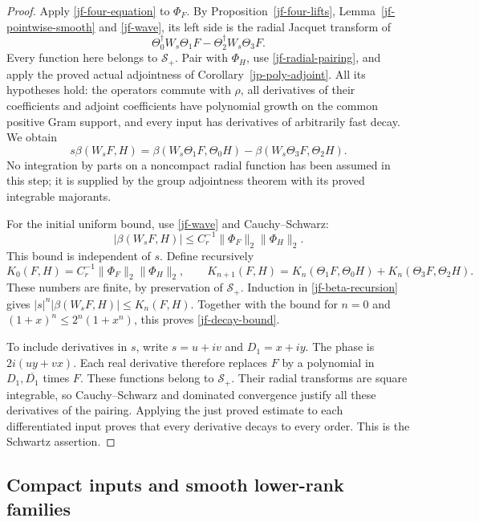 \begin{proof}
Apply \eqref{jf-four-equation} to \(\Phi_F\).  By
Proposition~\ref{jf-four-lifts}, Lemma~\ref{jf-pointwise-smooth}
and \eqref{jf-wave}, its left side is the radial Jacquet
transform of
\[
           \Theta_0^\dagger W_s\Theta_1F
                        -\Theta_2^\dagger W_s\Theta_3F.
\]
Every function here belongs to \(\mathscr S_+\).
Pair with \(\Phi_H\), use \eqref{jf-radial-pairing},
and apply the proved actual adjointness of
Corollary~\ref{jp-poly-adjoint}.  All its hypotheses hold:
the operators commute with \(\rho\), all derivatives of
their coefficients and adjoint coefficients have polynomial
growth on the common positive Gram support, and every input
has derivatives of arbitrarily fast decay.  We obtain
\begin{equation}\label{jf-beta-recursion}
 s\beta(W_sF,H)
       =\beta(W_s\Theta_1F,\Theta_0H)
                    -\beta(W_s\Theta_3F,\Theta_2H).
\end{equation}
No integration by parts on a noncompact radial function has
been assumed in this step; it is supplied by the group
adjointness theorem with its proved integrable majorants.

For the initial uniform bound, use \eqref{jf-wave} and
Cauchy--Schwarz:
\[
 |\beta(W_sF,H)|
 \leq C_r^{-1}\|\Phi_F\|_2\|\Phi_H\|_2.
\]
This bound is independent of \(s\).  Define recursively
\[
 K_0(F,H)=C_r^{-1}\|\Phi_F\|_2\|\Phi_H\|_2,\qquad
 K_{n+1}(F,H)=K_n(\Theta_1F,\Theta_0H)
                           +K_n(\Theta_3F,\Theta_2H).
\]
These numbers are finite, by preservation of \(\mathscr S_+\).
Induction in \eqref{jf-beta-recursion} gives
\( |s|^n|\beta(W_sF,H)|\leq K_n(F,H)\).
Together with the bound for \(n=0\) and
\((1+x)^n\leq2^n(1+x^n)\), this proves
\eqref{jf-decay-bound}.

To include derivatives in \(s\), write \(s=u+iv\) and
\(D_1=x+iy\).  The phase is \(2i(uy+vx)\).
Each real derivative therefore replaces \(F\) by a
polynomial in \(D_1,\overline{D_1}\) times \(F\).
These functions belong to \(\mathscr S_+\).
Their radial transforms are square integrable, so
Cauchy--Schwarz and dominated convergence justify all these
derivatives of the pairing.  Applying the just proved
estimate to each differentiated input proves that every
derivative decays to every order.  This is the Schwartz
assertion.
\end{proof}

\subsection{Compact inputs and smooth lower-rank families}

